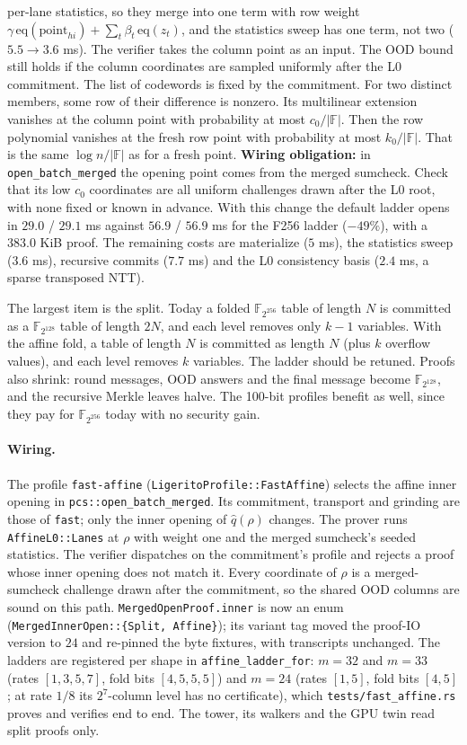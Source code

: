 \documentclass[11pt]{article}
\newcommand{\F}{\mathbb{F}}
\begin{document}
per-lane statistics, so they merge into one term with row weight
$\gamma\,\mathrm{eq}(\mathrm{point}_{hi}) + \sum_t \beta_t\,
\mathrm{eq}(z_t)$, and the statistics sweep has one term, not two
($5.5 \to 3.6$ ms). The verifier takes the column point as an input.
The OOD bound still holds if the column coordinates are sampled
uniformly after the L0 commitment. The list of codewords is fixed by
the commitment. For two distinct members, some row of their difference
is nonzero. Its multilinear extension vanishes at the column point with
probability at most $c_0/|\F|$. Then the row polynomial vanishes at the
fresh row point with probability at most $k_0/|\F|$. That is the same
$\log n/|\F|$ as for a fresh point. \textbf{Wiring obligation:} in
\texttt{open\_batch\_merged} the opening point comes from the merged
sumcheck. Check that its low $c_0$ coordinates are all uniform
challenges drawn after the L0 root, with none fixed or known in advance.
With this change the default ladder opens in $29.0$ / $29.1$ ms against
$56.9$ / $56.9$ ms for the F256 ladder ($-49\%$), with a $383.0$ KiB
proof. The remaining costs are materialize ($5$ ms), the statistics
sweep ($3.6$ ms), recursive commits ($7.7$ ms) and the L0 consistency
basis ($2.4$ ms, a sparse transposed NTT).

The largest item is the split. Today a folded $\F_{2^{256}}$ table of
length $N$ is committed as a $\F_{2^{128}}$ table of length $2N$, and
each level removes only $k - 1$ variables. With the affine fold, a
table of length $N$ is committed as length $N$ (plus $k$ overflow
values), and each level removes $k$ variables. The ladder should be
retuned. Proofs also shrink: round messages, OOD answers and the final
message become $\F_{2^{128}}$, and the recursive Merkle leaves halve.
The 100-bit profiles benefit as well, since they pay for
$\F_{2^{256}}$ today with no security gain.

\paragraph{Wiring.} The profile \texttt{fast-affine}
(\texttt{LigeritoProfile::FastAffine}) selects the affine inner opening
in \texttt{pcs::open\_batch\_merged}. Its commitment, transport and
grinding are those of \texttt{fast}; only the inner opening of
$\hat q(\rho)$ changes. The prover runs \texttt{AffineL0::Lanes} at
$\rho$ with weight one and the merged sumcheck's seeded statistics. The
verifier dispatches on the commitment's profile and rejects a proof
whose inner opening does not match it. Every coordinate of $\rho$ is a
merged-sumcheck challenge drawn after the commitment, so the shared OOD
columns are sound on this path. \texttt{MergedOpenProof.inner} is now
an enum (\texttt{MergedInnerOpen::\{Split, Affine\}}); its variant tag
moved the proof-IO version to $24$ and re-pinned the byte fixtures,
with transcripts unchanged. The ladders are registered per shape in
\texttt{affine\_ladder\_for}: $m = 32$ and $m = 33$ (rates $[1,3,5,7]$, fold bits
$[4,5,5,5]$) and $m = 24$ (rates $[1,5]$, fold bits $[4,5]$; at rate
$1/8$ its $2^7$-column level has no certificate), which
\texttt{tests/fast\_affine.rs} proves and verifies end to end. The
tower, its walkers and the GPU twin read split proofs only.
\end{document}
